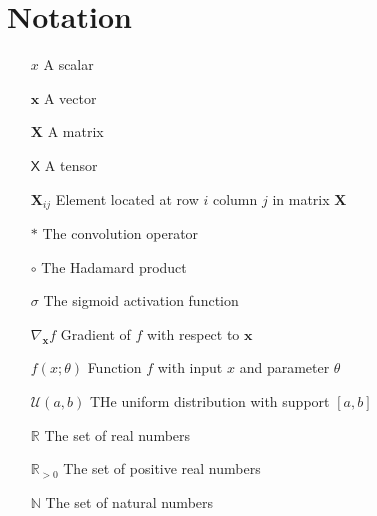 \documentclass[./main.tex]{subfiles}
\begin{document}
\section*{Notation}
\begin{itemize}[leftmargin=2.0cm,labelsep=0.5cm]
    \item[$x$] A scalar
    \item[$\bm{x}$] A vector
    \item[$\bm{X}$] A matrix
    \item[$\mathsf{X}$] A tensor 
    \item[$\bm{X}_{ij}$] Element located at row $i$ column $j$ in matrix $\bm{X}$
    \item[$*$] The convolution operator
    \item[$\circ$] The Hadamard product  
    \item[$\sigma$] The sigmoid activation function 
    \item[$\nabla_{\bm{x}} f$] Gradient of $f$ with respect to $\bm{x}$
    \item[$f(x; \theta)$] Function $f$ with input $x$ and parameter $\theta$
    \item[$\mathcal{U}(a, b)$] THe uniform distribution with support $[a, b]$
    \item[$\mathbb{R}$] The set of real numbers
    \item[$\mathbb{R}_{> 0}$] The set of positive real numbers
    \item[$\mathbb{N}$] The set of natural numbers
\end{itemize}
\end{document}
